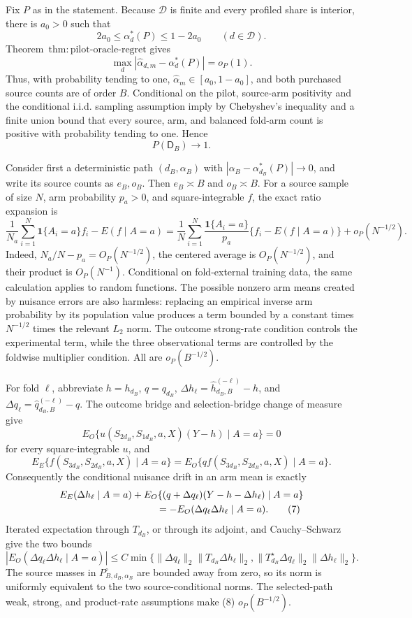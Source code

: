 Fix \(P\) as in the statement.  Because \(\mathcal D\) is finite and every profiled share is interior, there is \(a_0>0\) such that
\[
 2a_0\le\alpha_d^*(P)\le1-2a_0\qquad(d\in\mathcal D). \tag{1}
\]
Theorem~\(\mathrm{thm{:}pilot\text{-}oracle\text{-}regret}\) gives
\[
 \max_d|\widehat\alpha_{d,m}-\alpha_d^*(P)|=o_P(1). \tag{2}
\]
Thus, with probability tending to one, \(\widehat\alpha_m\in[a_0,1-a_0]\), and both purchased source counts are of order \(B\).  Conditional on the pilot, source-arm positivity and the conditional i.i.d. sampling assumption imply by Chebyshev's inequality and a finite union bound that every source, arm, and balanced fold-arm count is positive with probability tending to one.  Hence
\[
 P(\mathsf D_B)\to1. \tag{3}
\]

Consider first a deterministic path \((d_B,\alpha_B)\) with \(|\alpha_B-\alpha_{d_B}^*(P)|\to0\), and write its source counts as \(e_B,o_B\).  Then \(e_B\asymp B\) and \(o_B\asymp B\).  For a source sample of size \(N\), arm probability \(p_a>0\), and square-integrable \(f\), the exact ratio expansion is
\[
 \frac1{N_a}\sum_{i=1}^N\mathbf1\{A_i=a\}f_i-E(f\mid A=a)
 =\frac1N\sum_{i=1}^N\frac{\mathbf1\{A_i=a\}}{p_a}
 \{f_i-E(f\mid A=a)\}+o_P(N^{-1/2}). \tag{4}
\]
Indeed, \(N_a/N-p_a=O_P(N^{-1/2})\), the centered average is \(O_P(N^{-1/2})\), and their product is \(O_P(N^{-1})\).  Conditional on fold-external training data, the same calculation applies to random functions.  The possible nonzero arm means created by nuisance errors are also harmless: replacing an empirical inverse arm probability by its population value produces a term bounded by a constant times \(N^{-1/2}\) times the relevant \(L_2\) norm.  The outcome strong-rate condition controls the experimental term, while the three observational terms are controlled by the foldwise multiplier condition.  All are \(o_P(B^{-1/2})\).

For fold \(\ell\), abbreviate \(h=h_{d_B}\), \(q=q_{d_B}\), \(\Delta h_\ell=\widehat h_{d_B,B}^{(-\ell)}-h\), and \(\Delta q_\ell=\widehat q_{d_B,B}^{(-\ell)}-q\).  The outcome bridge and selection-bridge change of measure give
\[
 E_O\{u(S_{2d_B},S_{1d_B},a,X)(Y-h)\mid A=a\}=0 \tag{5}
\]
for every square-integrable \(u\), and
\[
 E_E\{f(S_{3d_B},S_{2d_B},a,X)\mid A=a\}
 =E_O\{qf(S_{3d_B},S_{2d_B},a,X)\mid A=a\}. \tag{6}
\]
Consequently the conditional nuisance drift in an arm mean is exactly
\[
\begin{aligned}
 &E_E(\Delta h_\ell\mid A=a)
 +E_O\{(q+\Delta q_\ell)(Y-h-\Delta h_\ell)\mid A=a\}\\
 &\hspace{35mm}=-E_O(\Delta q_\ell\Delta h_\ell\mid A=a). \tag{7}
\end{aligned}
\]
Iterated expectation through \(T_{d_B}\), or through its adjoint, and Cauchy--Schwarz give the two bounds
\[
 |E_O(\Delta q_\ell\Delta h_\ell\mid A=a)|
 \le C\min\{\|\Delta q_\ell\|_2\|T_{d_B}\Delta h_\ell\|_2,
 \|T_{d_B}^\star\Delta q_\ell\|_2\|\Delta h_\ell\|_2\}. \tag{8}
\]
The source masses in \(P_{B,d_B,\alpha_B}^{\circ}\) are bounded away from zero, so its norm is uniformly equivalent to the two source-conditional norms.  The selected-path weak, strong, and product-rate assumptions make (8) \(o_P(B^{-1/2})\).

